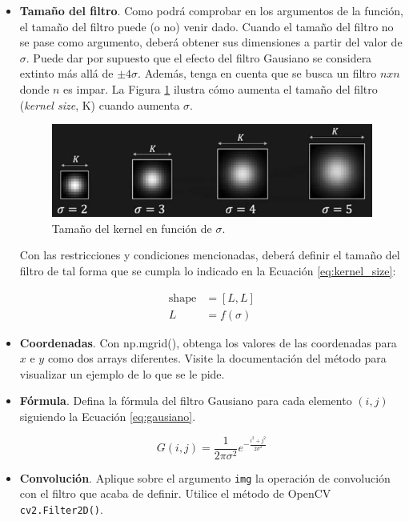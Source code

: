 \begin{itemize}
    \item \textbf{Tamaño del filtro}. Como podrá comprobar en los argumentos de la función, el tamaño del filtro puede (o no) venir dado. Cuando el tamaño del filtro no se pase como argumento, deberá obtener sus dimensiones a partir del valor de $\sigma$. Puede dar por supuesto que el efecto del filtro Gausiano se considera extinto más allá de $\pm4\sigma$. Además, tenga en cuenta que se busca un filtro $n x n$ donde $n$ es impar. La Figura \ref{fig:kernel_size} ilustra cómo aumenta el tamaño del filtro (\textit{kernel size}, K) cuando aumenta $\sigma$.

    \begin{figure}[h]
    \centering
    \includegraphics[width=0.6 \textwidth]{Lab_2/template/figures/kernel_size.png}
    \caption{Tamaño del kernel en función de $\sigma$.}
    \label{fig:kernel_size}
    \end{figure}

    Con las restricciones y condiciones mencionadas, deberá definir el tamaño del filtro de tal forma que se cumpla lo indicado en la Ecuación \ref{eq:kernel_size}:

    \begin{align}
     \text{shape} &= [L, L]\\
     L &= f(\sigma)
    \label{eq:kernel_size}
    \end{align}

    
    \item  \textbf{Coordenadas}. Con np.mgrid(), obtenga los valores de las coordenadas para $x$ e $y$ como dos arrays diferentes. Visite la documentación del método para visualizar un ejemplo de lo que se le pide.
    \item  \textbf{Fórmula}. Defina la fórmula del filtro Gausiano para cada elemento $(i, j)$ siguiendo la Ecuación \ref{eq:gausiano}.

    \begin{equation}
    G(i,j) = \frac{1}{2\pi\sigma^2} e^{-  \frac{i^2 + j^2}{2\sigma^2} }
    \label{eq:gausiano}
    \end{equation}

    \item  \textbf{Convolución}. Aplique sobre el argumento \texttt{img} la operación de convolución con el filtro que acaba de definir. Utilice el método de OpenCV \texttt{cv2.Filter2D()}.
\end{itemize}

